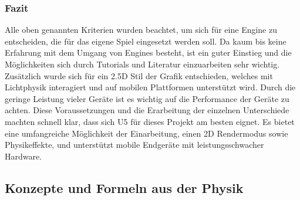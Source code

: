 \subsubsection{Fazit}
Alle oben genannten Kriterien wurden beachtet, um sich für eine Engine zu entscheiden, die für das eigene Spiel eingesetzt werden soll. Da kaum bis keine Erfahrung mit dem Umgang von Engines besteht, ist ein guter Einstieg und die Möglichkeiten sich durch Tutorials und Literatur einzuarbeiten sehr wichtig. Zusätzlich wurde sich für ein 2.5D Stil der Grafik entschieden, welches mit Lichtphysik interagiert und auf mobilen Plattformen unterstützt wird. Durch die geringe Leistung vieler Geräte ist es wichtig auf die Performance der Geräte zu achten. Diese Voraussetzungen und die Erarbeitung der einzelnen Unterschiede machten schnell klar, dass sich \ac{U5} für dieses Projekt am besten eignet. Es bietet eine umfangreiche Möglichkeit der Einarbeitung, einen 2D Rendermodus sowie Physikeffekte, und unterstützt mobile Endgeräte mit leistungsschwacher Hardware. 

\subsection{Konzepte und Formeln aus der Physik}


\newpage